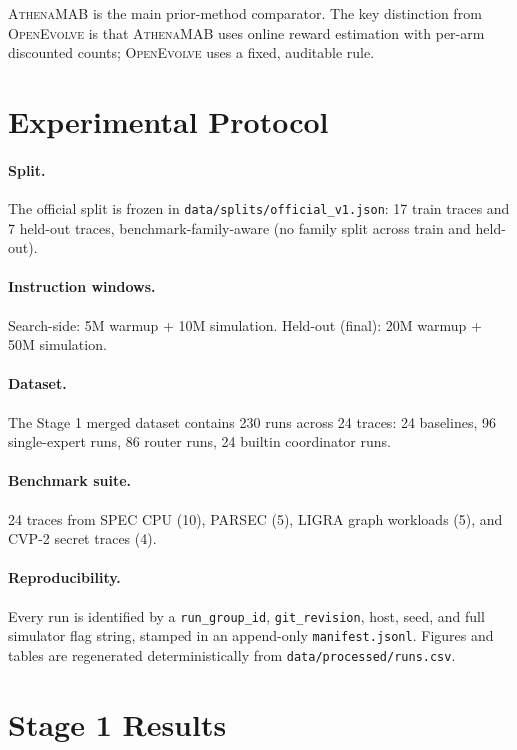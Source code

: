 \documentclass[10pt,twocolumn]{article}
\begin{document}
\textsc{AthenaMAB} is the main prior-method comparator. The key distinction from
\textsc{OpenEvolve} is that \textsc{AthenaMAB} uses online reward estimation with
per-arm discounted counts; \textsc{OpenEvolve} uses a fixed, auditable rule.

\section{Experimental Protocol}
\label{sec:protocol}

\paragraph{Split.} The official split is frozen in
\texttt{data/splits/official\_v1.json}: 17 train traces and 7 held-out traces,
benchmark-family-aware (no family split across train and held-out).

\paragraph{Instruction windows.} Search-side: 5M warmup + 10M simulation.
Held-out (final): 20M warmup + 50M simulation.

\paragraph{Dataset.} The Stage 1 merged dataset contains 230 runs across
24 traces: 24 baselines, 96 single-expert runs, 86 router runs, 24 builtin
coordinator runs.

\paragraph{Benchmark suite.} 24 traces from SPEC CPU (10), PARSEC (5),
LIGRA graph workloads (5), and CVP-2 secret traces (4).

\paragraph{Reproducibility.} Every run is identified by a \texttt{run\_group\_id},
\texttt{git\_revision}, host, seed, and full simulator flag string, stamped in an
append-only \texttt{manifest.jsonl}. Figures and tables are regenerated
deterministically from \texttt{data/processed/runs.csv}.

\section{Stage 1 Results}
\label{sec:stage1}
\end{document}

